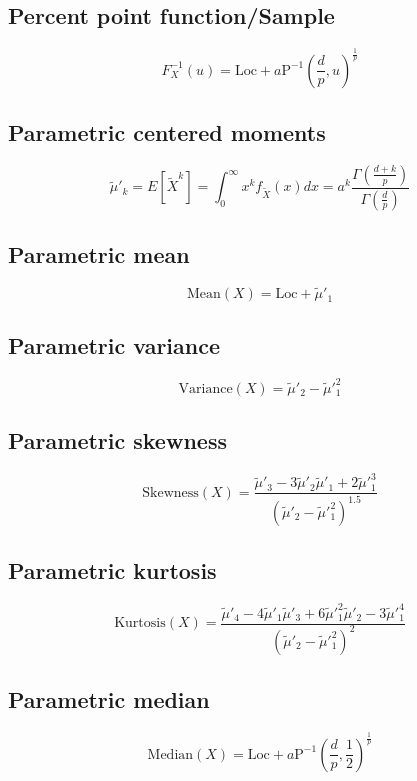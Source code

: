 \documentclass{article}
\begin{document}
\subsection{Percent point function/Sample}
\begin{equation*} F^{-1}_{X}\left(u\right)=\text{Loc}+a\text{P}^{-1}\left(\frac{d}{p},u\right)^{\frac{1}{p}} \end{equation*}
\subsection{Parametric centered moments}
\begin{equation*} \tilde{\mu}'_{k}=E[\tilde{X}^k]=\int_{0}^{\infty}x^{k}f_{\tilde{X}}\left(x\right)dx=a^k\frac{\Gamma (\frac{d+k}{p})}{\Gamma(\frac{d}{p})} \end{equation*}
\subsection{Parametric mean}
\begin{equation*} \mathrm{Mean}(X)=\text{Loc}+\tilde{\mu}'_{1} \end{equation*}
\subsection{Parametric variance}
\begin{equation*} \mathrm{Variance}(X)=\tilde{\mu}'_{2}-\tilde{\mu}'^{2}_{1} \end{equation*}
\subsection{Parametric skewness}
\begin{equation*} \mathrm{Skewness}(X)=\frac{\tilde{\mu}'_{3}-3\tilde{\mu}'_{2}\tilde{\mu}'_{1}+2\tilde{\mu}'^{3}_{1}}{(\tilde{\mu}'_{2}-\tilde{\mu}'^{2}_{1})^{1.5}} \end{equation*}
\subsection{Parametric kurtosis}
\begin{equation*} \mathrm{Kurtosis}(X)=\frac{\tilde{\mu}'_{4}-4\tilde{\mu}'_{1}\tilde{\mu}'_{3}+6\tilde{\mu}'^{2}_{1}\tilde{\mu}'_{2}-3\tilde{\mu}'^{4}_{1}}{(\tilde{\mu}'_{2}-\tilde{\mu}'^{2}_{1})^{2}} \end{equation*}
\subsection{Parametric median}
\begin{equation*} \mathrm{Median}(X)=\text{Loc}+a\text{P}^{-1}\left(\frac{d}{p},\frac{1}{2}\right)^{\frac{1}{p}} \end{equation*}
\end{document}
